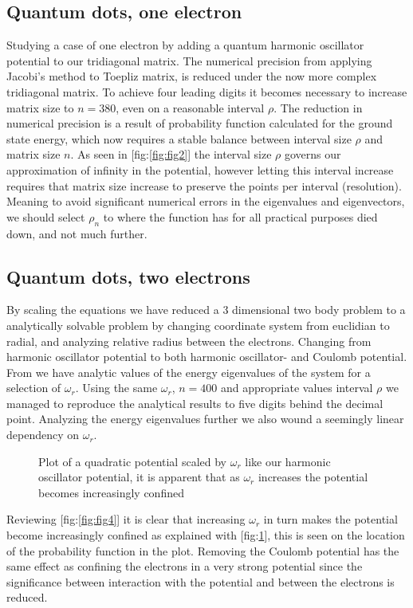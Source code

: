 \documentclass{emulateapj}
\begin{document}
\subsection{Quantum dots, one electron}
Studying a case of one electron by adding a quantum harmonic oscillator potential to our tridiagonal matrix. The numerical precision from applying Jacobi's method to Toepliz matrix, is reduced under the now more complex tridiagonal matrix. To achieve four leading digits it becomes necessary to increase matrix size to $n = 380$, even on a reasonable interval $\rho$. The reduction in numerical precision is a result of probability function calculated for the ground state energy, which now requires a stable balance between interval size $\rho$ and matrix size $n$. As seen in [fig:\ref{fig:fig2}] the interval size $\rho$ governs our approximation of infinity in the potential, however letting this interval increase requires that matrix size increase to preserve the points per interval (resolution). Meaning to avoid significant numerical errors in the eigenvalues and eigenvectors, we should select $\rho_{n}$ to where the function has for all practical purposes died down, and not much further.
%
\subsection{Quantum dots, two electrons}
%
By scaling the equations we have reduced a 3 dimensional two body problem to a analytically solvable problem by changing coordinate system from euclidian to radial, and analyzing relative radius between the electrons. Changing from harmonic oscillator potential to both harmonic oscillator- and Coulomb potential. From \cite{3} we have analytic values of the energy eigenvalues of the system for a selection of $\omega_{r}$. Using the same $\omega_{r}$, $n=400$ and appropriate values interval $\rho$ we managed to reproduce the analytical results to five digits behind the decimal point. Analyzing the energy eigenvalues further we also wound a seemingly linear dependency on $\omega_{r}$.
%
\begin{figure}[H]
\mbox{}
\caption{Plot of a quadratic potential scaled by $\omega_{r}$ like our harmonic oscillator potential, it is apparent that as $\omega_{r}$ increases the potential becomes increasingly confined}
\label{fig:fig5}
\end{figure}
%
Reviewing [fig:\ref{fig:fig4}] it is clear that increasing $\omega_{r}$ in turn makes the potential become increasingly confined as explained with [fig:\ref{fig:fig5}], this is seen on the location of the probability function in the plot. Removing the Coulomb potential has the same effect as confining the electrons in a very strong potential since the significance between interaction with the potential and between the electrons is reduced.
%
\end{document}

